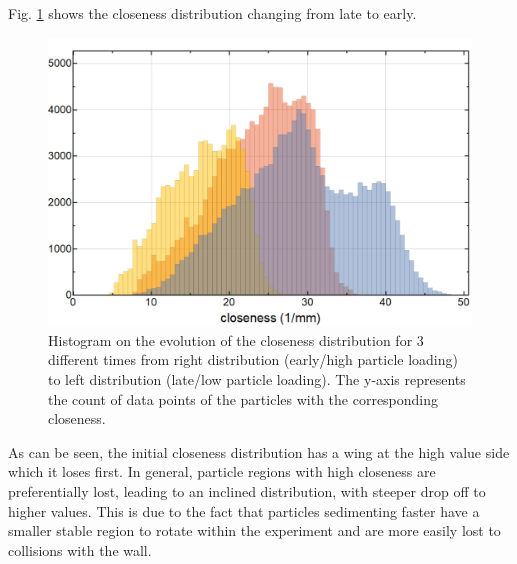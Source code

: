Fig. \ref{fig.speed2} shows the closeness distribution changing from late to early.
\begin{figure}[h]
\includegraphics[width=\columnwidth]{close259.pdf}
    \caption{\label{fig.speed2} {Histogram on the evolution} of the closeness distribution for 3 different times from right distribution ({early/high particle loading}) to left distribution ({late/low particle loading}). {The y-axis represents the count of data points of the particles with the corresponding closeness.}}
\end{figure}
As can be seen, the initial closeness distribution has a wing at the high value side which it loses first. In general, particle regions with high closeness are preferentially lost, leading to an inclined distribution, with steeper drop off to higher values. 
This is due to the fact that particles sedimenting faster have a smaller stable region to rotate within the experiment and are more easily lost to collisions with the wall.

